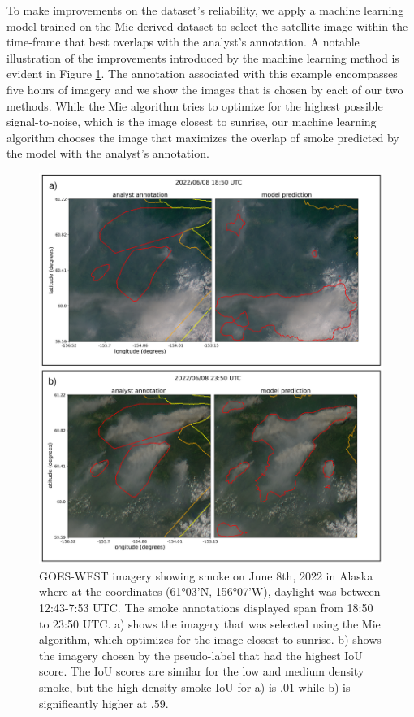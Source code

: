\documentclass{ametsocV6.1}
\begin{document}
To make improvements on the dataset's reliability, we apply a machine learning model trained on the Mie-derived dataset to select the satellite image within the time-frame that best overlaps with the analyst's annotation. A notable illustration of the improvements introduced by the machine learning method is evident in Figure \ref{ml_vs_mei}. The annotation associated with this example encompasses five hours of imagery and we show the images that is chosen by each of our two methods. While the Mie algorithm tries to optimize for the highest possible signal-to-noise, which is the image closest to sunrise, our machine learning algorithm chooses the image that maximizes the overlap of smoke predicted by the model with the analyst's annotation.



\begin{figure}
    \centering
    \includegraphics[width=15cm]{figures/ML_better_than_Mei_2.png}
    \caption{GOES-WEST imagery showing smoke on June 8th, 2022 in Alaska where at the coordinates (61°03'N, 156°07'W), daylight was between 12:43-7:53 UTC. The smoke annotations displayed span from 18:50 to 23:50 UTC. a) shows the imagery that was selected using the Mie algorithm, which optimizes for the image closest to sunrise. b) shows the imagery chosen by the pseudo-label that had the highest IoU score. The IoU scores are similar for the low and medium density smoke, but the
    high density smoke IoU for a) is .01 while b) is significantly higher at .59.}\label{ml_vs_mei}
\end{figure}
\end{document}

